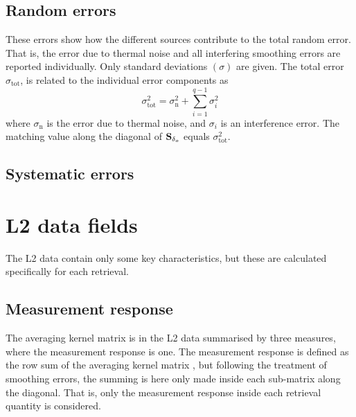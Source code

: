 \subsection{Random errors}
\label{sec:erand}
%
These errors show how the different sources contribute to the total random
error. That is, the error due to thermal noise and all interfering smoothing
errors are reported individually. Only standard deviations $(\sigma)$ are
given. The total error $\sigma_\mathrm{tot}$, is related to the individual
error components as
\begin{equation}
  \label{eq:randerr:sigma}
  \sigma_\mathrm{tot}^2 = \sigma_\mathrm{n}^2 + \sum_{i=1}^{q-1} \sigma_{i}^2
\end{equation}
where $\sigma_\mathrm{n}$ is the error due to thermal noise, and $\sigma_{i}$
is an interference error. The matching value along the diagonal of
$\mathbf{S}_{\delta_o}$ equals $\sigma_\mathrm{tot}^2$.


\subsection{Systematic errors}
\label{sec:esyst}
%



\section{L2 data fields}
%
The L2 data contain only some key characteristics, but these are calculated
specifically for each retrieval.


\subsection{Measurement response}
\label{sec:mresp}
%
The averaging kernel matrix is in the L2 data summarised by three measures,
where the measurement response is one. The measurement response is defined as
the row sum of the averaging kernel matrix \citep{baron:studi:02}, but
following the treatment of smoothing errors, the summing is here only made
inside each sub-matrix along the diagonal. That is, only the measurement
response inside each retrieval quantity is considered.


